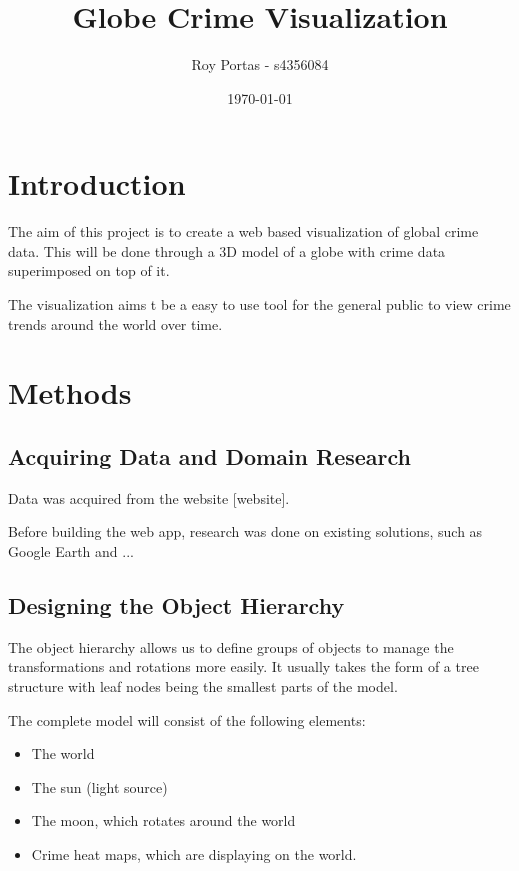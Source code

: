 \documentclass[]{article}
\begin{document}
\title{Globe Crime Visualization}
\author{Roy Portas - s4356084}
\date{\today}
\maketitle 

\section{Introduction}

The aim of this project is to create a web based visualization of global crime data.
This will be done through a 3D model of a globe with crime data superimposed on top of it.

The visualization aims t be a easy to use tool for the general public to view crime trends around the world over time.

\section{Methods}

\subsection{Acquiring Data and Domain Research}

Data was acquired from the website [website].

Before building the web app, research was done on existing solutions, such as Google Earth and ...

\subsection{Designing the Object Hierarchy}

The object hierarchy allows us to define groups of objects to manage the transformations and rotations more easily.
It usually takes the form of a tree structure with leaf nodes being the smallest parts of the model.

The complete model will consist of the following elements:

\begin{itemize}
	\item The world
	\item The sun (light source)
	\item The moon, which rotates around the world
	\item Crime heat maps, which are displaying on the world.
\end{itemize}
\end{document}
